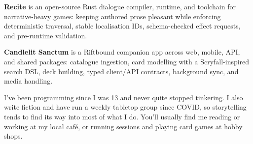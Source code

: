 

\textbf{Recite} is an open-source Rust dialogue compiler, runtime, and toolchain for narrative-heavy games: keeping authored prose pleasant while enforcing deterministic traversal, stable localisation IDs, schema-checked effect requests, and pre-runtime validation.

\textbf{Candlelit Sanctum} is a Riftbound companion app across web, mobile, API, and shared packages: catalogue ingestion, card modelling with a Scryfall-inspired search DSL, deck building, typed client/API contracts, background sync, and media handling.

\vspace{0.4em}\noindent{\color{cvrule}\rule{\textwidth}{0.4pt}}\vspace{0.4em}

I've been programming since I was 13 and never quite stopped tinkering. I also write fiction and have run a weekly tabletop group since COVID, so storytelling tends to find its way into most of what I do. You'll usually find me reading or working at my local caf\'e, or running sessions and playing card games at hobby shops.
